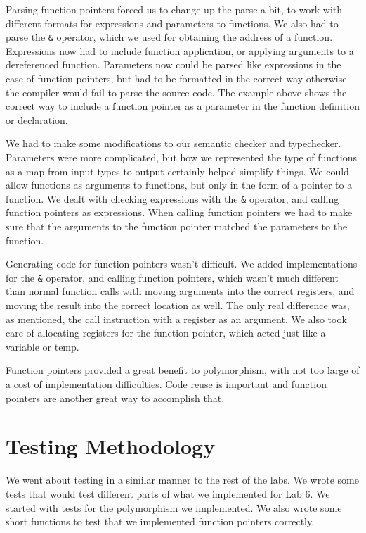 \documentclass[aps,letterpaper,11pt]{revtex4}
\newcommand{\ttt}[1]{\texttt{#1}}
\begin{document}
Parsing function pointers forced us to change up the parse a bit, to work with
different formats for expressions and parameters to functions. We also had
to parse the \ttt{\&} operator, which we used for obtaining the address of
a function. Expressions now had to include function application, or applying
arguments to a dereferenced function. Parameters now could be parsed like
expressions in the case of function pointers, but had to be formatted in the
correct way otherwise the compiler would fail to parse the source code. The
example above shows the correct way to include a function pointer as a
parameter in the function definition or declaration.

We had to make some modifications to our semantic checker and typechecker.
Parameters were more complicated, but how we represented the type of functions
as a map from input types to output certainly helped simplify things. We could
allow functions as arguments to functions, but only in the form of a pointer
to a function. We dealt with checking expressions with the \ttt{\&} operator,
and calling function pointers as expressions. When calling function pointers
we had to make sure that the arguments to the function pointer matched the
parameters to the function.

Generating code for function pointers wasn't difficult. We added
implementations for the \ttt{\&} operator, and calling function pointers,
which wasn't much different than normal function calls with moving
arguments into the correct registers, and moving the result into the correct
location as well. The only real difference was, as mentioned, the call
instruction with a register as an argument. We also took care of allocating
registers for the function pointer, which acted just like a variable or temp.

Function pointers provided a great benefit to polymorphism, with not too large
of a cost of implementation difficulties. Code reuse is important and function
pointers are another great way to accomplish that.

\newpage
\section{Testing Methodology}
We went about testing in a similar manner to the rest of the labs. We wrote
some tests that would test different parts of what we implemented for Lab 6.
We started with tests for the polymorphism we implemented. We also wrote
some short functions to test that we implemented function pointers correctly.
\end{document}
